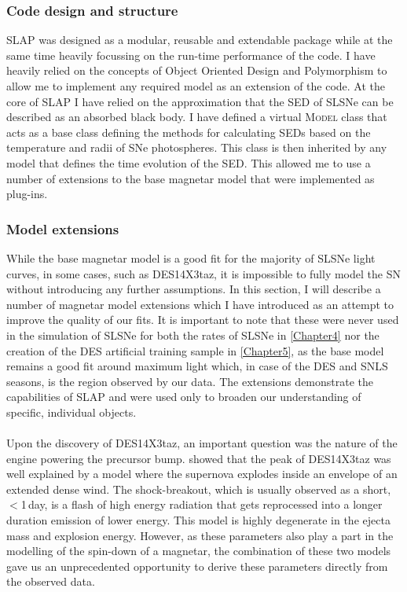 \subsubsection{Code design and structure}
SLAP was designed as a modular, reusable and extendable package while at the same time heavily focussing on the run-time performance of the code. I have heavily relied on the concepts of Object Oriented Design and Polymorphism to allow me to implement any required model as an extension of the code. At the core of \textsc{SLAP} I have relied on the approximation that the SED of SLSNe can be described as an absorbed black body. I have defined a virtual \textsc{Model} class that acts as a base class defining the methods for calculating SEDs based on the temperature and radii of SNe photospheres. This class is then inherited by any model that defines the time evolution of the SED. This allowed me to use a number of extensions to the base magnetar model that were implemented as plug-ins.

\subsubsection{Model extensions} \label{sec:MagExtensions}
While the base magnetar model is a good fit for the majority of SLSNe light curves, in some cases, such as DES14X3taz, it is impossible to fully model the SN without introducing any further assumptions. In this section, I will describe a number of magnetar model extensions which I have introduced as an attempt to improve the quality of our fits. It is important to note that these were never used in the simulation of SLSNe for both the rates of SLSNe in \cref{Chapter4} nor the creation of the DES artificial training sample in \cref{Chapter5}, as the base model remains a good fit around maximum light which, in case of the DES and SNLS seasons, is the region observed by our data. The extensions demonstrate the capabilities of \textsc{SLAP} and were used only to broaden our understanding of specific, individual objects.

\paragraph{\citet{Piro2015}}
Upon the discovery of DES14X3taz, an important question was the nature of the engine powering the precursor bump. \citet{Smith2016} showed that the peak of DES14X3taz was well explained by a model where the supernova explodes inside an envelope of an extended dense wind. The shock-breakout, which is usually observed as a short, $<$1\,day, is a flash of high energy radiation that gets reprocessed into a longer duration emission of lower energy. This model is highly degenerate in the ejecta mass and explosion energy. However, as these parameters also play a part in the modelling of the spin-down of a magnetar, the combination of these two models gave us an unprecedented opportunity to derive these parameters directly from the observed data.

